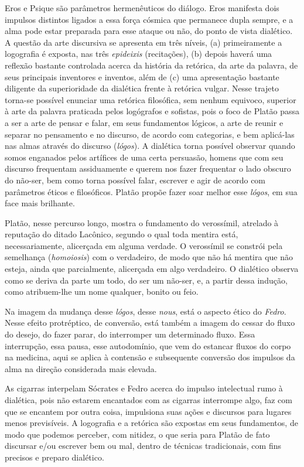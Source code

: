 Eros e Psique são parâmetros hermenêuticos do diálogo. Eros manifesta
dois impulsos distintos ligados a essa força cósmica que permanece dupla
sempre, e a alma pode estar preparada para esse ataque ou não, do ponto
de vista dialético. A questão da arte discursiva se apresenta em três
níveis, (a) primeiramente a logografia é exposta, nas três
\emph{epideixis} (recitações), (b) depois haverá uma reflexão bastante
controlada acerca da história da retórica, da arte da palavra, de seus
principais inventores e inventos, além de (c) uma apresentação bastante
diligente da superioridade da dialética frente à retórica vulgar. Nesse
trajeto torna-se possível enunciar uma retórica filosófica, sem nenhum
equivoco, superior à arte da palavra praticada pelos logógrafos e
sofistas, pois o foco de Platão passa a ser a arte de pensar e falar, em
seus fundamentos lógicos, a arte de reunir e separar no pensamento e no
discurso, de acordo com categorias, e bem aplicá-las nas almas através
do discurso (\emph{lógos}). A dialética torna possível observar quando
somos enganados pelos artífices de uma certa persuasão, homens que com
seu discurso frequentam assiduamente e querem nos fazer frequentar o
lado obscuro do não-ser, bem como torna possível falar, escrever e agir
de acordo com parâmetros éticos e filosóficos. Platão propõe fazer soar
melhor esse \emph{lógos}, em sua face mais brilhante.

Platão, nesse percurso longo, mostra o fundamento do verossímil,
atrelado à reputação do ditado Lacônico, segundo o qual toda mentira
está, necessariamente, alicerçada em alguma verdade. O verossímil se
constrói pela semelhança (\emph{homoiosis}) com o verdadeiro, de modo
que não há mentira que não esteja, ainda que parcialmente, alicerçada em
algo verdadeiro. O dialético observa como se deriva da parte um todo, do
ser um não-ser, e, a partir dessa indução, como atribuem-lhe um nome
qualquer, bonito ou feio.

Na imagem da mudança desse \emph{lógos}, desse \emph{nous}, está o
aspecto ético do \emph{Fedro}. Nesse efeito protréptico, de conversão,
está também a imagem do cessar do fluxo do desejo, do fazer parar, do
interromper um determinado fluxo. Essa interrupção, essa pausa, esse
autodomínio, que vem do estancar fluxos do corpo na medicina, aqui se
aplica à contensão e subsequente conversão dos impulsos da alma na
direção considerada mais elevada.

As cigarras interpelam Sócrates e Fedro acerca do impulso intelectual
rumo à dialética, pois não estarem encantados com as cigarras interrompe
algo, faz com que se encantem por outra coisa, impulsiona suas ações e
discursos para lugares menos previsíveis. A logografia e a retórica são
expostas em seus fundamentos, de modo que podemos perceber, com nitidez,
o que seria para Platão de fato discursar e/ou escrever bem ou mal,
dentro de técnicas tradicionais, com fins precisos e preparo dialético.

